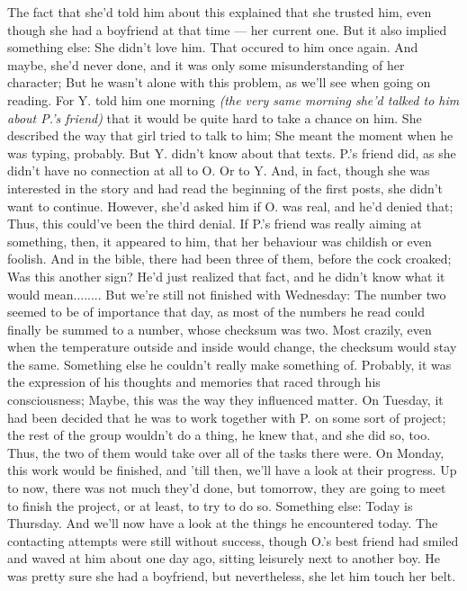The fact that she'd told him about this explained that she trusted him, even though she had a boyfriend at that time --- her current one. But it also implied something else: She didn't love him. 
That occured to him once again. 
And maybe, she'd never done, and it was only some misunderstanding of her character; But he wasn't alone with this problem, as we'll see when going on reading. 
For Y. told him one morning \emph{(the very same morning she'd talked to him about P.'s friend)} that it would be quite hard to take a chance on him. She described the way that girl tried to talk to him; She meant the moment when he was typing, probably. But Y. didn't know about that texts. 
P.'s friend did, as she didn't have no connection at all to O. 
Or to Y. And, in fact, though she was interested in the story and had read the beginning of the first posts, she didn't want to continue. However, she'd asked him if O. was real, and he'd denied that; Thus, this could've been the third denial. If P.'s friend was really aiming at something, then, it appeared to him, that her behaviour was childish or even foolish. 
And in the bible, there had been three of them, before the cock croaked; Was this another sign?
He'd just realized that fact, and he didn't know what it would mean........
But we're still not finished with Wednesday: The number two seemed to be of importance that day, as most of the numbers he read could finally be summed to a number, whose checksum was two. Most crazily, even when the temperature outside and inside would change, the checksum would stay the same. 
Something else he couldn't really make something of. 
Probably, it was the expression of his thoughts and memories that raced through his consciousness; Maybe, this was the way they influenced matter. 
On Tuesday, it had been decided that he was to work together with P. on some sort of project; the rest of the group wouldn't do a thing, he knew that, and she did so, too. 
Thus, the two of them would take over all of the tasks there were. 
On Monday, this work would be finished, and 'till then, we'll have a look at their progress. Up to now, there was not much they'd done, but tomorrow, they are going to meet to finish the project, or at least, to try to do so. 
Something else: Today is Thursday. 
And we'll now have a look at the things he encountered today. The contacting attempts were still without success, though O.'s best friend had smiled and waved at him about one day ago, sitting leisurely next to another boy. He was pretty sure she had a boyfriend, but nevertheless, she let him touch her belt. 
